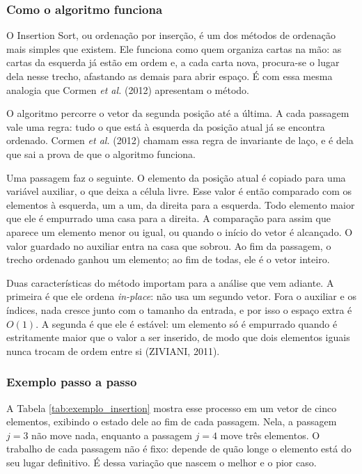 \subsubsection{Como o algoritmo funciona}

\indent \qquad O Insertion Sort, ou ordenação por inserção, é um dos métodos de
ordenação mais simples que existem. Ele funciona como quem organiza cartas na
mão: as cartas da esquerda já estão em ordem e, a cada carta nova, procura-se o
lugar dela nesse trecho, afastando as demais para abrir espaço. É com essa mesma
analogia que Cormen \textit{et al.} (2012) apresentam o método.

\qquad O algoritmo percorre o vetor da segunda posição até a última. A cada
passagem vale uma regra: tudo o que está à esquerda da posição atual já se
encontra ordenado. Cormen \textit{et al.} (2012) chamam essa regra de invariante
de laço, e é dela que sai a prova de que o algoritmo funciona.

\qquad Uma passagem faz o seguinte. O elemento da posição atual é copiado para
uma variável auxiliar, o que deixa a célula livre. Esse valor é então comparado
com os elementos à esquerda, um a um, da direita para a esquerda. Todo elemento
maior que ele é empurrado uma casa para a direita. A comparação para assim que
aparece um elemento menor ou igual, ou quando o início do vetor é alcançado. O
valor guardado no auxiliar entra na casa que sobrou. Ao fim da passagem, o
trecho ordenado ganhou um elemento; ao fim de todas, ele é o vetor inteiro.

\qquad Duas características do método importam para a análise que vem adiante. A
primeira é que ele ordena \textit{in-place}: não usa um segundo vetor. Fora o
auxiliar e os índices, nada cresce junto com o tamanho da entrada, e por isso o
espaço extra é $O(1)$. A segunda é que ele é estável: um elemento só é empurrado
quando é estritamente maior que o valor a ser inserido, de modo que dois
elementos iguais nunca trocam de ordem entre si (ZIVIANI, 2011).

\subsubsection{Exemplo passo a passo}

\indent \qquad A Tabela \ref{tab:exemplo_insertion} mostra esse processo em um vetor de
cinco elementos, exibindo o estado dele ao fim de cada passagem. Nela, a
passagem $j = 3$ não move nada, enquanto a passagem $j = 4$ move três elementos.
O trabalho de cada passagem não é fixo: depende de quão longe o elemento está do
seu lugar definitivo. É dessa variação que nascem o melhor e o pior caso.

